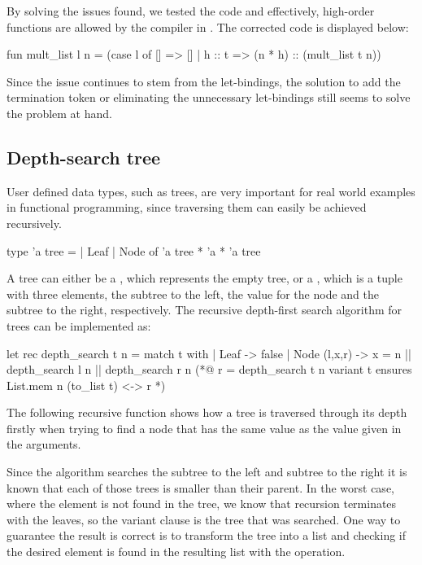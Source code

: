 By solving the issues found, we tested the code and effectively, high-order functions are allowed by the compiler in \cml. The corrected 
code is displayed below:

\begin{cakeml}
fun mult_list l n =
    (case l of
        [] => []
    | h :: t => (n * h) :: (mult_list t n))
\end{cakeml}

Since the issue continues to stem from the let-bindings, the solution to add the termination token or eliminating the unnecessary 
let-bindings still seems to solve the problem at hand.

\subsection{Depth-search tree}

User defined data types, such as trees, are very important for real world examples in functional programming, since traversing them
can easily be achieved recursively. 

\begin{gospell}
type 'a tree =
    | Leaf
    | Node of 'a tree * 'a * 'a tree
\end{gospell}

A tree can either be a , which represents the empty tree, or a , which is a tuple with three elements, 
the subtree to the left, the value for the node and the subtree to the right, respectively. The recursive depth-first search algorithm 
for trees can be implemented as:

\begin{gospell}
let rec depth_search t n = 
  match t with
  | Leaf -> false
  | Node (l,x,r) -> x = n || depth_search l n || depth_search r n
(*@
  r = depth_search t n
  variant t
  ensures List.mem n (to_list t) <-> r
*)
\end{gospell}

The following recursive function  shows how a tree is traversed through its depth firstly when trying to find
a node that has the same value as the value given in the arguments.

Since the algorithm searches the subtree to the left and subtree to the right it is known that each of those trees is smaller than their
parent. In the worst case, where the element is not found in the tree, we know that recursion terminates with the leaves, so the variant 
clause is the tree that was searched. One way to guarantee the result is correct is to transform the tree into a list and checking if
the desired element is found in the resulting list with the  operation.

